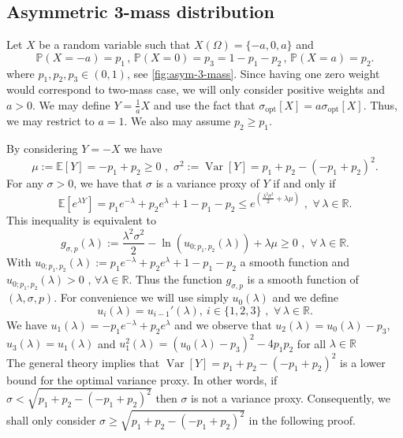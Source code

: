 \documentclass[a4paper, 10pt]{article}
\renewcommand{\P}{\mathbb{P}}
\newcommand{\E}{\mathbb{E}}
\newcommand{\beq}{\begin{equation}}
\newcommand{\eeq}{\end{equation}}
\theoremstyle{definition}
\begin{document}
\subsection{Asymmetric 3-mass distribution}\label{subsec;asymmthreepoints}

Let $X$ be a random variable such that $X(\Omega)=\{-a,0,a\}$ and 
\begin{equation}
    \P(X=-a)=p_1\,,\, \P(X=0)=p_3 = 1-p_1-p_2\,,\, \P(X=a)=p_2.
\end{equation}
where $p_1, p_2, p_3\in \left( 0,1\right)$, see \autoref{fig:asym-3-mass}. Since having one zero weight would correspond to two-mass case,  we will only consider positive weights and $a>0$. We may define $Y=\frac{1}{a}X$ and use the fact that $\sigma_{\mathrm{opt}}[X]=a \sigma_{\mathrm{opt}}[X]$. Thus, we may restrict to $a=1$. We also may assume $p_2 \geq p_1$.  


By considering $Y=-X$ we have
\beq \mu:=\E[Y]=-p_1+p_2 \geq 0\,\,,\,\, \sigma^2:=\operatorname{Var}[Y]=p_1+p_2-(-p_1+p_2)^2 .\eeq
For any $\sigma>0$, we have that $\sigma$ is a variance proxy of $Y$ if and only if
\beq \E\left[e^{\lambda Y}\right]=p_1 e^{-\lambda }+ p_2e^{\lambda } +1-p_1-p_2\leq e^{(\frac{\lambda^2\sigma^2}{2}+\lambda \mu)} \,\, ,\,\, \forall \, \lambda\in \mathbb{R} .\eeq
This inequality is equivalent to
\beq g_{\sigma,p}(\lambda):=\frac{\lambda^2\sigma^2}{2}-\ln(u_{0;p_1, p_2}(\lambda))+\lambda \mu \geq 0 \,\,,\,\,  \forall \, \lambda\in \mathbb{R}.\eeq
With  $u_{0;p_1, p_2}(\lambda) := p_1e^{-\lambda}+p_2e^{\lambda}+1-p_1-p_2$ a smooth function and  $u_{0;p_1, p_2}(\lambda) > 0 \text{ , } \forall \lambda \in \mathbb{R}$. Thus the function $g_{\sigma,p}$ is a smooth function of $(\lambda,\sigma,p)$. For convenience we will use simply $u_0(\lambda)$ and we define
\beq u_{i}(\lambda)=u_{i-1}'(\lambda),   \  i  \in \{1,2,3\} \,\,,\,\,  \forall \, \lambda\in \mathbb{R}.\eeq
We have $u_1(\lambda) = - p_1e^{-\lambda} + p_2e^{\lambda}$ and we observe that $u_2(\lambda) = u_0(\lambda)-p_3$, $u_3(\lambda) = u_1(\lambda)$ and $u_1^2(\lambda)=(u_0(\lambda)-p_3)^2-4p_1p_2$ for all $\lambda \in \mathbb{R}$ \\
The general theory implies that $\operatorname{Var}[Y]=p_1+p_2-(-p_1+p_2)^2$ is a lower bound for the optimal variance proxy. In other words, if $\sigma<\sqrt{p_1+p_2-(-p_1+p_2)^2}$ then $\sigma$ is not a variance proxy. Consequently, we shall only consider $\sigma \geq\sqrt{p_1+p_2-(-p_1+p_2)^2}$ in the following proof.
\end{document}
